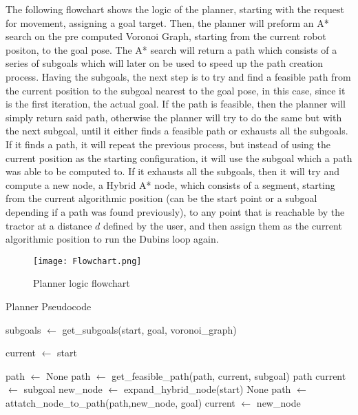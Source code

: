 The following flowchart shows the logic of the planner, starting with 
the request for movement, assigning a goal target. Then, the planner will 
preform an A* search on the pre computed Voronoi Graph, starting from the current robot 
positon, to the goal pose. The A* search will return a path which consists 
of a series of subgoals which will later on be used to speed up the 
path creation process. Having the subgoals, the next step is to try and 
find a feasible path from the current position to the subgoal nearest to 
the goal pose, in this case, since it is the first iteration, the actual goal. 
If the path is feasible, then the planner will simply return said path, otherwise
 the planner will try to do the same but with the next subgoal, until it either finds 
a feasible path or exhausts all the subgoals. If it finds a path, it will 
repeat the previous process, but instead of using the current position as the 
starting configuration, it will use the subgoal which a path was able to be 
computed to. If it exhausts all the subgoals, then it will try and compute a new node, 
a Hybrid A* node, which consists of a segment, starting from the current algorithmic position 
(can be the start point or a subgoal depending if a path was found previously), to any point 
that is reachable by the tractor at a distance $d$ defined by the user, and then assign them as the 
current algorithmic position to run the Dubins loop again.
\begin{figure}[h]
    \centering
    \texttt{[image: Flowchart.png]}
    \caption{Planner logic flowchart}
\end{figure}

\begin{algorithm}
\caption{Planner Pseudocode}
\label{alg:planner}
\begin{algorithmic}[1]
    \State subgoals $\gets$ get\_subgoals(start, goal, voronoi\_graph)

    \State current $\gets$ start

    \State path $\gets$ None
        \State path $\gets$ get\_feasible\_path(path, current, subgoal)
                \State \Return path
            \Else
                \State current $\gets$ subgoal
            \EndIf
        \EndIf
    \EndFor
        \State new\_node $\gets$ expand\_hybrid\_node(start)
            \State \Return None
        \EndIf
        \State path $\gets$ attatch\_node\_to\_path(path,new\_node, goal)
        \State current $\gets$ new\_node
    \EndWhile
\EndFunction
\end{algorithmic}
\end{algorithm}

